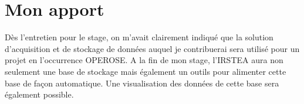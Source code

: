 \section{Mon apport}
Dès l'entretien pour le stage, on m'avait clairement indiqué que la solution d'acquisition et de stockage de données auquel je contribuerai sera utilisé pour un projet en l'occurrence OPEROSE. A la fin de mon stage, l'IRSTEA  aura non seulement une base de stockage mais également un outils pour alimenter cette base de façon automatique. Une visualisation des données de cette base sera également possible.
